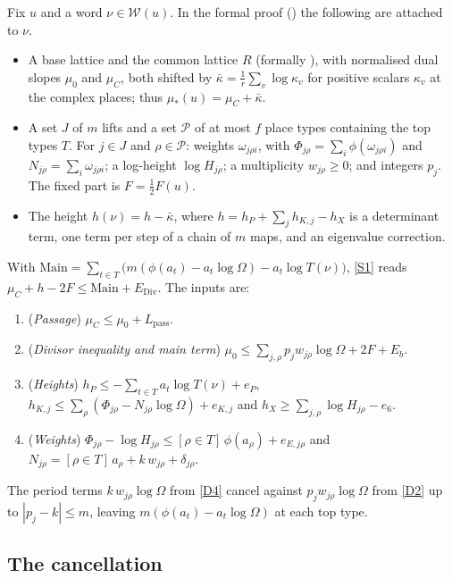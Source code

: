 \documentclass[11pt]{amsart}
\theoremstyle{plain}
\theoremstyle{definition}
\numberwithin{equation}{section}
\begin{document}
Fix $u$ and a word $\nu\in\mathcal W(u)$. In the formal proof () the following
are attached to $\nu$.
\begin{itemize}
\item A base lattice and the common lattice $R$ (formally ), with normalised dual slopes $\mu_0$ and $\mu_C$,
  both shifted by $\bar\kappa=\frac1r\sum_v\log\kappa_v$ for positive scalars $\kappa_v$ at the complex
  places; thus $\mu_\ast(u)=\mu_C+\bar\kappa$.
\item A set $J$ of $m$ lifts and a set $\mathcal P$ of at most $f$ place types containing the top
  types $T$. For $j\in J$ and $\rho\in\mathcal P$: weights $\omega_{j\rho i}$, with
  $\Phi_{j\rho}=\sum_i\phi(\omega_{j\rho i})$ and $N_{j\rho}=\sum_i\omega_{j\rho i}$; a log-height
  $\log H_{j\rho}$; a multiplicity $w_{j\rho}\ge0$; and integers $p_j$. The fixed part is $F=\frac12F(u)$.
\item The height $h(\nu)=h-\bar\kappa$, where $h=h_P+\sum_jh_{K,j}-h_X$ is a determinant term, one
  term per step of a chain of $m$ maps, and an eigenvalue correction.
\end{itemize}
With $\mathrm{Main}=\sum_{t\in T}\bigl(m(\phi(a_t)-a_t\log\Omega)-a_t\log T(\nu)\bigr)$, \ref{S1} reads
$\mu_C+h-2F\le\mathrm{Main}+E_{\mathrm{Div}}$. The inputs are:
\begin{enumerate}[label=\textup{(D\arabic*)}, leftmargin=3.2em]
\item\label{D1} (\emph{Passage}) $\mu_C\le\mu_0+L_{\mathrm{pass}}$.
\item\label{D2} (\emph{Divisor inequality and main term})
  $\mu_0\le\sum_{j,\rho}p_jw_{j\rho}\log\Omega+2F+E_b$.
\item\label{D3} (\emph{Heights}) $h_P\le-\sum_{t\in T}a_t\log T(\nu)+e_P$,
  $h_{K,j}\le\sum_\rho(\Phi_{j\rho}-N_{j\rho}\log\Omega)+e_{K,j}$ and
  $h_X\ge\sum_{j,\rho}\log H_{j\rho}-e_6$.
\item\label{D4} (\emph{Weights}) $\Phi_{j\rho}-\log H_{j\rho}\le[\rho\in T]\,\phi(a_\rho)+e_{E,j\rho}$ and
  $N_{j\rho}=[\rho\in T]\,a_\rho+k\,w_{j\rho}+\delta_{j\rho}$.
\end{enumerate}
The period terms $k\,w_{j\rho}\log\Omega$ from \ref{D4} cancel against $p_jw_{j\rho}\log\Omega$ from
\ref{D2} up to $|p_j-k|\le m$, leaving $m(\phi(a_t)-a_t\log\Omega)$ at each top type.

\subsection{The cancellation}
\end{document}
